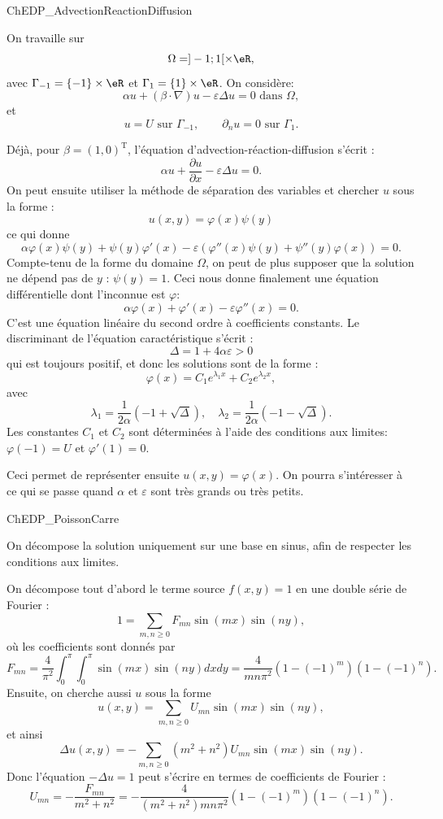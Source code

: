 \newpage

\begin{corrige}{ChEDP_AdvectionReactionDiffusion}

On travaille sur
\[
\Omega = ]-1;1[ \times \eR,
\]
avec $\Gamma_{-1} = \{ -1 \} \times \eR$ et $\Gamma_1 = \{ 1 \} \times \eR$.
On considère:
\[
\alpha u + ( \beta \cdot \nabla ) u - \varepsilon \Delta u = 0 \mbox{ dans } \Omega,
\]
et
\[
u = U \mbox{ sur } \Gamma_{-1}, \qquad \partial_n u = 0 \mbox{ sur } \Gamma_1.
\]

Déjà, pour $\beta = (1,0)^\mathrm{T}$, l'équation d'advection-réaction-diffusion s'écrit :
\[
\alpha u + \frac{\partial u}{\partial x} - \varepsilon \Delta u = 0. \]
On peut ensuite utiliser la méthode de séparation des variables et chercher $u$ sous la forme :
\[
u(x,y) = \varphi(x) \psi (y)
\]
ce qui donne
\[
\alpha \varphi (x) \psi(y) + \psi(y) \varphi'(x) 
- \varepsilon (\varphi''(x) \psi(y) + \psi''(y) \varphi(x)) = 0.
\]
Compte-tenu de la forme du domaine $\Omega$, on peut de plus supposer que la solution ne dépend pas de $y$ : $\psi(y)=1$. Ceci nous donne finalement une équation différentielle dont l'inconnue est $\varphi$:
\[
\alpha \varphi (x) + \varphi'(x) - \varepsilon \varphi''(x) = 0.
\]
C'est une équation linéaire du second ordre à coefficients constants. Le discriminant de l'équation caractéristique s'écrit :
\[
\Delta = 1 + 4 \alpha \varepsilon > 0
\]
qui est toujours positif, et donc les solutions sont de la forme :
\[
\varphi(x) = C_1 e^{\lambda_1 x} + C_2 e^{\lambda_2 x},
\]
avec
\[
\lambda_1 = \frac{1}{2\alpha} (-1 + \sqrt{\Delta}), \quad
\lambda_2 = \frac{1}{2\alpha} (-1 - \sqrt{\Delta}).
\]
Les constantes $C_1$ et $C_2$ sont déterminées à l'aide des conditions aux limites: $\varphi(-1) = U$ et $\varphi'(1) = 0$.

\medskip

Ceci permet de représenter ensuite $u(x,y) = \varphi(x)$. On pourra s'intéresser à ce qui se passe quand $\alpha$ et $\varepsilon$ sont très grands ou très petits.

\end{corrige}

\medskip

\begin{corrige}{ChEDP_PoissonCarre}

On décompose la solution uniquement sur une base en sinus, afin de respecter les conditions aux limites.

On décompose tout d'abord le terme source $f(x,y)=1$ en une double série de Fourier :
\[
1 = \sum_{m,n\geq0} F_{mn} \sin(mx) \sin(ny),
\]
où les coefficients sont donnés par 
\[
F_{mn} = \frac{4}{\pi^2} \int_0^\pi \int_0^\pi \sin(mx) \sin(ny) dx dy
= \frac{4}{mn \pi^2} ( 1 - (-1)^m ) ( 1 - (-1)^n ).
\]
Ensuite, on cherche aussi $u$ sous la forme
\[
u(x,y) = \sum_{m,n\geq0} U_{mn} \sin(mx) \sin(ny),
\]
et ainsi
\[
\Delta u(x,y) = - \sum_{m,n\geq0} (m^2 +n^2) U_{mn} \sin(mx) \sin(ny).
\]
Donc l'équation $-\Delta u = 1$ peut s'écrire en termes de coefficients de Fourier :
\[
U_{mn} = -\frac{F_{mn}}{m^2 + n^2}
= -\frac{4}{(m^2 + n^2) mn \pi^2} ( 1 - (-1)^m ) ( 1 - (-1)^n ).
\]

\end{corrige}

